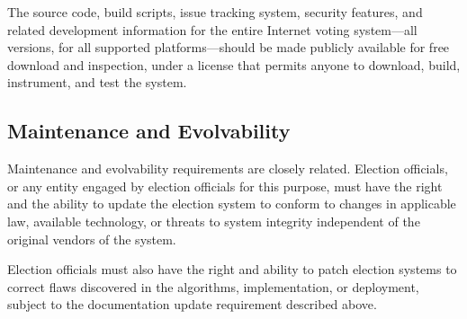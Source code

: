 The source code, build scripts, issue tracking system, security
features, and related development information for the entire Internet
voting system---all versions, for all supported platforms---should be
made publicly available for free download and inspection, under a
license that permits anyone to download, build, instrument, and test
the system.

\subsection{Maintenance and Evolvability}

Maintenance and evolvability requirements are closely
related. Election officials, or any entity engaged by election
officials for this purpose, must have the right and the ability to
update the election system to conform to changes in applicable law,
available technology, or threats to system integrity independent of
the original vendors of the system. 

Election officials must also have the right and ability to patch
election systems to correct flaws discovered in the algorithms,
implementation, or deployment, subject to the documentation update
requirement described above.
